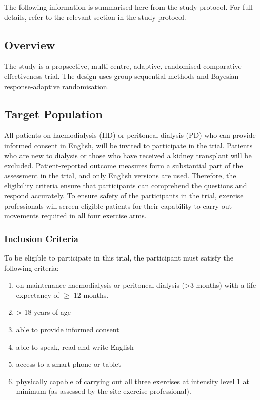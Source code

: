 \documentclass[11pt,parskip=half-]{scrartcl}
\providecommand{\tightlist}{%
  \setlength{\itemsep}{0pt}\setlength{\parskip}{0pt}}
\begin{document}
The following information is summarised here from the study protocol. For full details, refer to the relevant section in the study protocol.

\subsection{Overview}\label{overview}

The study is a propsective, multi-centre, adaptive, randomised comparative effectiveness trial. The design uses group sequential methods and Bayesian response-adaptive randomisation.

\subsection{Target Population}\label{target-population}

All patients on haemodialysis (HD) or peritoneal dialysis (PD) who can provide informed consent in English, will be invited to participate in the trial. Patients who are new to dialysis or those who have received a kidney transplant will be excluded. Patient-reported outcome measures form a substantial part of the assessment in the trial, and only English versions are used. Therefore, the eligibility criteria ensure that participants can comprehend the questions and respond accurately. To ensure safety of the participants in the trial, exercise professionals will screen eligible patients for their capability to carry out movements required in all four exercise arms.

\subsubsection{Inclusion Criteria}\label{inclusion-criteria}

To be eligible to participate in this trial, the participant must satisfy the following criteria:

\begin{enumerate}
  \def\labelenumi{\arabic{enumi}.}
  \tightlist
  \item on maintenance haemodialysis or peritoneal dialysis (>3 months) with a life expectancy of $\ge$ 12 months.
  \item > 18 years of age
  \item able to provide informed consent
  \item able to speak, read and write English
  \item access to a smart phone or tablet
  \item physically capable of carrying out all three exercises at intensity level 1 at minimum (as assessed by the site exercise professional).
\end{enumerate}
\end{document}
